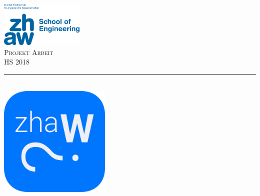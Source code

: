 
\begin{titlepage} %
	\newcommand{\HRule}{\rule{\linewidth}{0.5mm}} %

	\center %


	\includegraphics[width=0.3\textwidth, left]{./assets/zhawLogo.jpeg}\\[1cm]

	\textsc{\Large Projekt Arbeit}\\[0.5cm] %

	\textsc{\large HS 2018}\\[0.5cm] %


	\HRule\\[0.5cm]


	\includegraphics[width=0.4\textwidth]{./assets/zhawoLogo.png}\\[0.5cm]


\end{titlepage}
